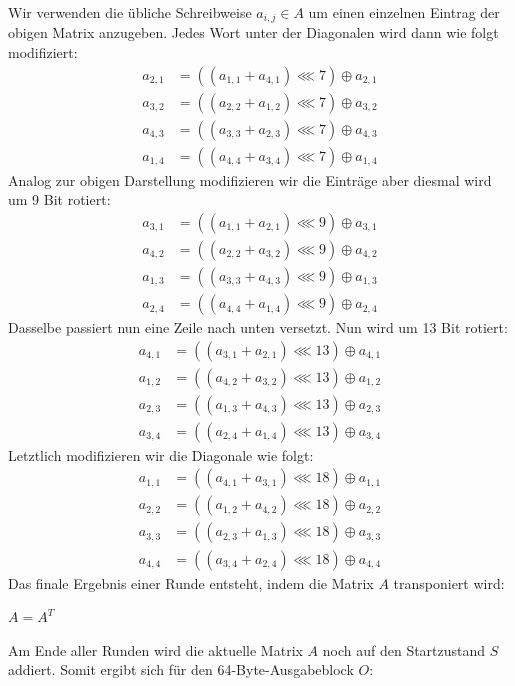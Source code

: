 \documentclass[course=erap]{aspdoc}
\begin{document}
Wir verwenden die übliche Schreibweise $a_{i,j} \in A$ um einen einzelnen Eintrag der obigen Matrix anzugeben. Jedes Wort unter der Diagonalen wird dann wie folgt modifiziert:
\begin{align*}
a_{2,1} &= ((a_{1,1} + a_{4,1}) \lll 7) \oplus a_{2,1} \\
a_{3,2} &= ((a_{2,2} + a_{1,2}) \lll 7) \oplus a_{3,2} \\
a_{4,3} &= ((a_{3,3} + a_{2,3}) \lll 7) \oplus a_{4,3} \\
a_{1,4} &= ((a_{4,4} + a_{3,4}) \lll 7) \oplus a_{1,4}
\end{align*}
%
%
Analog zur obigen Darstellung modifizieren wir die Einträge aber diesmal wird um 9 Bit rotiert:
\begin{align*}
a_{3,1} &= ((a_{1,1} + a_{2,1}) \lll 9) \oplus a_{3,1} \\
a_{4,2} &= ((a_{2,2} + a_{3,2}) \lll 9) \oplus a_{4,2} \\
a_{1,3} &= ((a_{3,3} + a_{4,3}) \lll 9) \oplus a_{1,3} \\
a_{2,4} &= ((a_{4,4} + a_{1,4}) \lll 9) \oplus a_{2,4}
\end{align*}
%
%
Dasselbe passiert nun eine Zeile nach unten versetzt. Nun wird um 13 Bit rotiert:
\begin{align*}
a_{4,1} &= ((a_{3,1} + a_{2,1}) \lll 13) \oplus a_{4,1} \\
a_{1,2} &= ((a_{4,2} + a_{3,2}) \lll 13) \oplus a_{1,2} \\
a_{2,3} &= ((a_{1,3} + a_{4,3}) \lll 13) \oplus a_{2,3} \\
a_{3,4} &= ((a_{2,4} + a_{1,4}) \lll 13) \oplus a_{3,4}
\end{align*}
%
%
Letztlich modifizieren wir die Diagonale wie folgt: 
\begin{align*}
a_{1,1} &= ((a_{4,1} + a_{3,1}) \lll 18) \oplus a_{1,1} \\
a_{2,2} &= ((a_{1,2} + a_{4,2}) \lll 18) \oplus a_{2,2} \\
a_{3,3} &= ((a_{2,3} + a_{1,3}) \lll 18) \oplus a_{3,3} \\
a_{4,4} &= ((a_{3,4} + a_{2,4}) \lll 18) \oplus a_{4,4}
\end{align*}
%
%
Das finale Ergebnis einer Runde entsteht, indem die Matrix \(A\) transponiert wird:

\begin{center}
	\(A = A^T\)
\end{center}
Am Ende aller Runden wird die aktuelle Matrix \(A\) noch auf den Startzustand \(S\) addiert.
Somit ergibt sich für den 64-Byte-Ausgabeblock \(O\):
\end{document}
